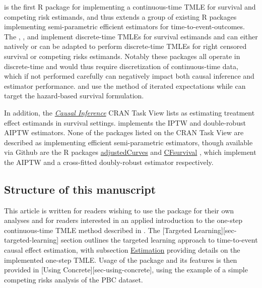  is the first R package for implementing a continuous-time TMLE for survival and competing risk estimands, and thus extends a group of existing R packages implementing semi-parametric efficient estimators for time-to-event-outcomes. The  \citep{schwab_ltmle_2020},  \citep{sofrygin_stremr_2017}, and  \citep{benkeser_survtmle_2019} implement discrete-time TMLEs for survival estimands and can either natively or can be adapted to perform discrete-time TMLEs for right censored survival or competing risks estimands. Notably these packages all operate in discrete-time and would thus require discretization of continuous-time data, which if not performed carefully can negatively impact both causal inference and estimator performance\citep{sofrygin_targeted_2019, ferreira_guerra_impact_2020, sloma_empirical_2021}.  and  use the method of iterated expectations while  can target the hazard-based survival formulation.

In addition, the \href{https://CRAN.R-project.org/view=CausalInference}{\emph{Causal Inference}} CRAN Task View lists  \citep{gerds_riskregression_2022} as estimating treatment effect estimands in survival settings.  implements the IPTW and double-robust AIPTW estimators. None of the packages listed on the  CRAN Task View are described as implementing efficient semi-parametric estimators, though available via Github are the R packages \href{https://github.com/RobinDenz1/adjustedCurves}{adjustedCurves} \citep{denz_comparison_2022} and \href{https://github.com/tedwestling/CFsurvival}{CFsurvival} \citep{westling_inference_2021}, which implement the AIPTW and a cross-fitted doubly-robust estimator respectively.

\hypertarget{sec-structure}{%
\subsection{Structure of this manuscript}\label{sec-structure}}

This article is written for readers wishing to use the  package for their own analyses and for readers interested in an applied introduction to the one-step continuous-time TMLE method described in \citep{rytgaard_one-step_2021}. The {[}Targeted Learning{]}{[}sec-targeted-learning{]} section outlines the targeted learning approach to time-to-event causal effect estimation, with subsection \protect\hyperlink{sec-estimation}{Estimation} providing details on the implemented one-step TMLE. Usage of the  package and its features is then provided in {[}Using Concrete{]}{[}sec-using-concrete{]}, using the example of a simple competing risks analysis of the PBC dataset.

